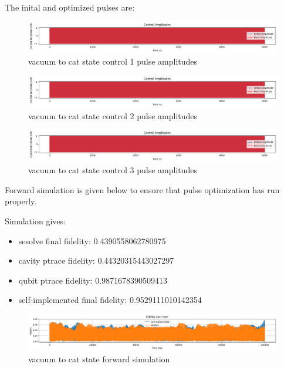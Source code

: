 \documentclass[12pt]{report}
\begin{document}
The inital and optimized pulses are: 
\begin{figure}[H]
    \centering
    \includegraphics[width=0.95\linewidth]{vac2cat_effective_Hamiltonian_GRAPE_control1.png}
    \caption{vacuum to cat state control 1 pulse amplitudes}
    \label{fig:vac2cat_effective_Hamiltonian_GRAPE_control1}
\end{figure}
\begin{figure}[H]
    \centering
    \includegraphics[width=0.95\linewidth]{vac2cat_effective_Hamiltonian_GRAPE_control2.png}
    \caption{vacuum to cat state control 2 pulse amplitudes}
    \label{fig:vac2cat_effective_Hamiltonian_GRAPE_control2}
\end{figure}
\begin{figure}[H]
    \centering
    \includegraphics[width=0.95\linewidth]{vac2cat_effective_Hamiltonian_GRAPE_control3.png}
    \caption{vacuum to cat state control 3 pulse amplitudes}
    \label{fig:vac2cat_effective_Hamiltonian_GRAPE_control3}
\end{figure}

Forward simulation is given below to ensure that pulse optimization has run properly. 
\par
Simulation gives: 
\begin{itemize}
    \item sesolve final fidelity:  0.4390558062780975
    \item cavity ptrace fidelity:  0.44320315443027297
    \item qubit ptrace fidelity:  0.9871678390509413
    \item self-implemented final fidelity:  0.9529111010142354
\end{itemize}
\begin{figure}[H]
    \centering
    \includegraphics[width=0.95\linewidth]{vac2cat_effective_Hamiltonian_GRAPE_simulations.png}
    \caption{vacuum to cat state forward simulation}
    \label{fig:vac2cat_effective_Hamiltonian_GRAPE_simulations}
\end{figure}
\end{document}
